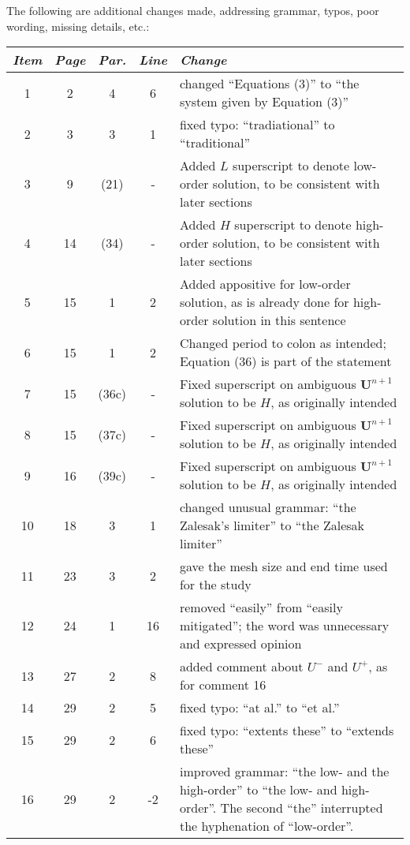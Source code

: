 The following are additional changes made, addressing grammar, typos, poor
wording, missing details, etc.:

\begin{tabular}{c c c c p{3in}}
\emph{Item} & \emph{Page} & \emph{Par.} & \emph{Line} & \emph{Change}\\\hline
1 & 2 & 4 & 6 & changed ``Equations (3)'' to ``the system given by Equation (3)''\\
2 & 3 & 3 & 1 & fixed typo: ``tradiational'' to ``traditional''\\
3 & 9  & (21) & - & Added $L$ superscript to denote low-order solution, to be consistent with later sections\\
4 & 14 & (34) & - & Added $H$ superscript to denote high-order solution, to be consistent with later sections\\
5 & 15 & 1 & 2 & Added appositive for low-order solution, as is already done for high-order solution in this sentence\\
6 & 15 & 1 & 2 & Changed period to colon as intended; Equation (36) is part of the statement\\
7 & 15 & (36c) & - & Fixed superscript on ambiguous $\mathbf{U}^{n+1}$ solution to be $H$, as originally intended\\
8 & 15 & (37c) & - & Fixed superscript on ambiguous $\mathbf{U}^{n+1}$ solution to be $H$, as originally intended\\
9 & 16 & (39c) & - & Fixed superscript on ambiguous $\mathbf{U}^{n+1}$ solution to be $H$, as originally intended\\
10 & 18 & 3 & 1 & changed unusual grammar: ``the Zalesak's limiter'' to ``the Zalesak limiter''\\
11 & 23 & 3 & 2 & gave the mesh size and end time used for the study\\
12 & 24 & 1 & 16 & removed ``easily'' from ``easily mitigated''; the word was unnecessary and expressed opinion\\
13 & 27 & 2 & 8 & added comment about $U^-$ and $U^+$, as for comment 16\\
14 & 29 & 2 & 5 & fixed typo: ``at al.'' to ``et al.''\\
15 & 29 & 2 & 6 & fixed typo: ``extents these'' to ``extends these''\\
16 & 29 & 2 & -2 & improved grammar: ``the low- and the high-order'' to ``the low- and high-order''.
  The second ``the'' interrupted the hyphenation of ``low-order''.\\
\end{tabular}


